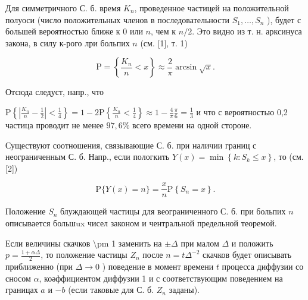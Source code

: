 \documentclass[10pt]{article}
\begin{document}
Для симметричного С. б. время $K_{n}$, проведенное частицей на положительной полуоси (число положительных членов в последовательности $S_{1}, \ldots, S_{n}$ ), будет с большей вероятностью ближе к 0 или $n$, чем к $n / 2$. Это видно из т. н. арксинуса закона, в силу к-рого лри больпих $n$ (см. [1], т. 1)



\[

\mathrm{P}=\left\{\frac{K_{n}}{n}<x\right\} \approx \frac{2}{\pi} \arcsin \sqrt{x} .

\]



Отсюда следуст, напр., что



$\mathrm{P}\left\{\left|\frac{K_{n}}{n}-\frac{1}{2}\right|<\frac{1}{4}\right\}=1-2 \mathrm{P}\left\{\frac{K_{n}}{n}<\frac{1}{4}\right\} \approx 1-\frac{4}{\pi} \frac{\pi}{6}=\frac{1}{3}$ и что с вероятностью 0,2 частица проводит не менее $97,6 \%$ всего времени на одной стороне.



Существуют соотношения, связывающие С. б. при наличии границ с неограниченным С. б. Напр., если пологкить $Y(x)=\min \left\{k: S_{k} \leqslant x\right\}$, то (см. [2])



\[

\mathrm{P}\{Y(x)=n\}=\frac{x}{n} \mathrm{P}\left\{S_{n}=x\right\} .

\]



Положение $S_{n}$ блуждающей частицы для веограниченного С. б. при больпих $n$ описывается большux чисел законом и чентральной предельной теоремой.



Если величины скачков \textbackslash pm 1 заменить на $\pm \Delta$ при малом $\Delta$ и положить $p=\frac{1+\alpha \Delta}{2}$, то положение частицы $Z_{n}$ после $n=t \Delta^{-2}$ скачков будет описывать приближенно (при $\Delta \rightarrow 0$ ) поведение в момент времени $t$ процесса диффузии со сносом $\alpha$, коәффициентом диффузии 1 и с соответствующим поведением на границах $a$ и $-b$ (если таковые для С. б. $Z_{n}$ заданы).
\end{document}
